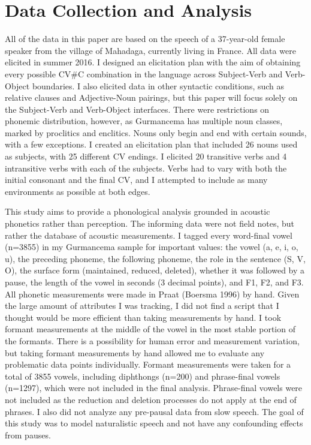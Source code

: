 \documentclass[output=paper,
modfonts
]{langscibook}
\begin{document}
\section{Data Collection and Analysis}

All of the data in this paper are based on the speech of a 37-year-old female 
speaker from the village of Mahadaga, currently living in France. All data were elicited in summer 2016. I designed an elicitation plan with the aim of obtaining every possible CV\#C combination in the language across Subject-Verb and Verb-Object boundaries. I also elicited data in other syntactic conditions, such as relative clauses and Adjective-Noun pairings, but this paper will focus solely on the Subject-Verb and Verb-Object interfaces. There were restrictions on phonemic distribution, however, as Gurmancema has multiple noun classes, marked by proclitics and enclitics.  Nouns only begin and end with certain sounds, with a few exceptions. I created an elicitation plan that included 26 nouns used as subjects, with 25 different CV endings. I elicited 20 transitive verbs and 4 intransitive verbs with each of the subjects. Verbs had to vary with both the initial consonant and the final CV, and I attempted to include as many environments as possible at both edges. 

This study aims to provide a phonological analysis grounded in acoustic phonetics rather than perception. The informing data were not field notes, but rather the database of acoustic measurements. I tagged every word-final vowel (n=3855) in my Gurmancema sample for important values: the vowel (a, e, i, o, u), the preceding phoneme, the following phoneme, the role in the sentence (S, V, O), the surface form (maintained, reduced, deleted), whether it was followed by a pause, the length of the vowel in seconds (3 decimal points), and F1, F2, and 
F3. All phonetic measurements were made in Praat (Boersma 1996) by hand. Given the large amount of attributes I was tracking, I did not find a script that I thought would be more efficient than taking measurements by hand. I took formant measurements at the middle of the vowel in the most stable portion of the formants. There is a possibility for human error and measurement variation, but taking formant measurements by hand allowed me to evaluate any problematic data points individually. Formant measurements were taken for a total of 3855 vowels, including diphthongs (n=200) and phrase-final vowels (n=1297), which were not included in the final 
analysis. Phrase-final vowels were not included as the reduction and deletion processes do not apply at the end of phrases. I also did not analyze any pre-pausal data from slow speech. The goal of this study was to model naturalistic speech and not have any confounding effects from pauses. 
\end{document}
